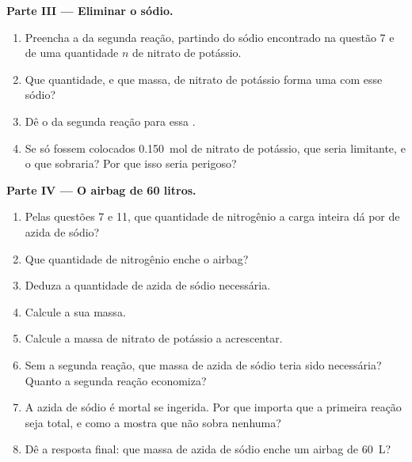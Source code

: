 \begin{problem}
\medskip
\noindent\textbf{Parte III --- Eliminar o sódio.}
\begin{enumerate}[resume]
  \item Preencha a  da segunda reação, partindo do sódio
        encontrado na questão 7 e de uma quantidade $n$ de nitrato de
        potássio.
  \item Que quantidade, e que massa, de nitrato de potássio forma uma
         com esse sódio?
  \item Dê o  da segunda reação para essa .
  \item Se só fossem colocados \qty{0.150}{mol} de nitrato de potássio,
        que  seria limitante, e o que sobraria? Por que isso
        seria perigoso?
\end{enumerate}

\medskip
\noindent\textbf{Parte IV --- O airbag de 60 litros.}
\begin{enumerate}[resume]
  \item Pelas questões 7 e 11, que quantidade de nitrogênio a carga
        inteira dá por  de azida de sódio?
  \item Que quantidade de nitrogênio enche o airbag?
  \item Deduza a quantidade de azida de sódio necessária.
  \item Calcule a sua massa.
  \item Calcule a massa de nitrato de potássio a acrescentar.
  \item Sem a segunda reação, que massa de azida de sódio teria sido
        necessária? Quanto a segunda reação economiza?
  \item A azida de sódio é mortal se ingerida. Por que importa que a
        primeira reação seja total, e como a  mostra que
        não sobra nenhuma?
  \item Dê a resposta final: que massa de azida de sódio enche um airbag
        de \qty{60}{L}?
\end{enumerate}
\end{problem}
